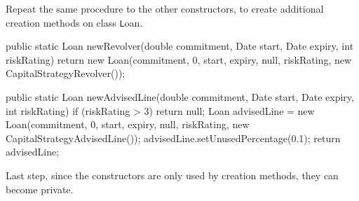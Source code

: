 \documentclass[a4paper,11pt]{memoir}
\newcommand{\code}[1]{{\texttt #1}}
\begin{document}
\begin{exercise}
    Repeat the same procedure  to the other constructors, to create additional creation methods on class \code{Loan}.
\end{exercise}
\begin{solution}
\begin{java}
public static Loan newRevolver(double commitment, Date start, Date expiry, int riskRating) {
    return new Loan(commitment, 0, start, expiry, null, riskRating, new CapitalStrategyRevolver());
}

public static Loan newAdvisedLine(double commitment, Date start, Date expiry, int riskRating) {
    if (riskRating > 3) return null;
    Loan advisedLine = new Loan(commitment, 0, start, expiry, null, riskRating, new CapitalStrategyAdvisedLine());
      advisedLine.setUnusedPercentage(0.1);
      return advisedLine;
}
\end{java}
\end{solution}

\begin{exercise}
    Last step, since the constructors are only used by creation methods, they can become private.
\end{exercise}




\end{document}
